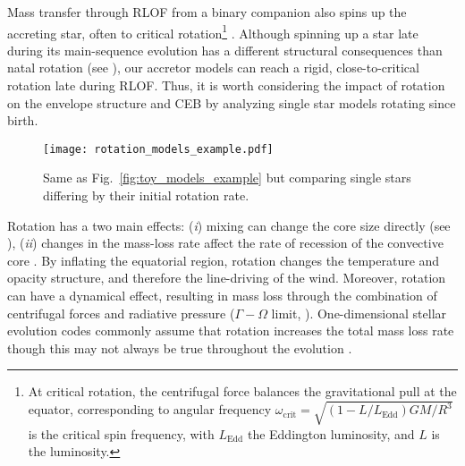 \documentclass[twocolumn,twocolappendix,trackchanges]{aastex63}
\DeclareRobustCommand{\Figref}[1]{Fig.~\ref{#1}}
\begin{document}
Mass transfer through RLOF from a binary companion also spins up the
accreting star, often to critical rotation\footnote{At critical
  rotation, the centrifugal force
  balances the gravitational pull at the equator, corresponding to
  angular frequency
  $\omega_\mathrm{crit}=\sqrt{(1-L/L_\mathrm{Edd})GM/R^3}$ is the
  critical spin frequency, with $L_\mathrm{Edd}$ the Eddington
  luminosity, and $L$ is the luminosity.} \citep[e.g.,][]{lubow:1975,
  packet:1981, cantiello:2007}. Although spinning up a star late during its
main-sequence evolution has a different structural consequences than
natal rotation (see \citealt{renzo:2021zoph}), our accretor models can
reach a rigid, close-to-critical rotation late during RLOF.
Thus, it is worth considering the impact of rotation on the envelope
structure and CEB by analyzing single star models rotating since
birth.

\begin{figure}[htbp]
  \centering
  \texttt{[image: rotation\_models\_example.pdf]}
  \caption{Same as \Figref{fig:toy_models_example} but comparing
    single stars differing by their initial rotation rate.}
  \label{fig:rotation_models_example}
\end{figure}

Rotation has a two main effects: (\emph{i}) mixing can change the core
size directly (see \citealt{heger:2000, maeder:00}), (\emph{ii})
changes in the mass-loss rate \cite[e.g.,][]{langer:1998, muller:2014,
  gagnier:2019} affect the rate of recession of the convective core
\citep[e.g.,][]{renzo:2017, renzo:2020ppi_conv}. By inflating the
equatorial region, rotation changes the temperature and opacity
structure, and therefore the line-driving of the wind. Moreover,
rotation can have a dynamical effect, resulting in mass loss through
the combination of centrifugal forces and radiative pressure
($\Gamma-\Omega$ limit, \citealt{langer:1998}). One-dimensional stellar
evolution codes commonly assume that rotation increases the total mass
loss rate \citep[e.g.,][]{langer:1998, heger:2000} though this may not
always be true throughout the evolution \citep[e.g.,][]{gagnier:2019}.
\end{document}
